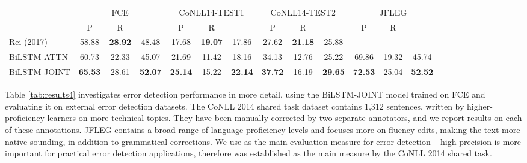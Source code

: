 \documentclass[letterpaper]{article} \usepackage{aaai19}  \usepackage{times}  \usepackage{helvet}  \usepackage{courier}  \usepackage{graphicx}
\renewcommand\cite{\citep}	\newcommand\newcite{\citet}
\begin{document}
\begin{table*}[t]
\centering
\setlength\tabcolsep{6.7pt}
\begin{tabular}{l|ccc|ccc|ccc|ccc} \toprule
 & \multicolumn{3}{c|}{{\small FCE}} & \multicolumn{3}{c|}{{\small CoNLL14-TEST1}} & \multicolumn{3}{c|}{{\small CoNLL14-TEST2}} & \multicolumn{3}{c}{{\small JFLEG}} \\
& {\small P} & {\small R} & {\small } & {\small P} & {\small R} & {\small } & {\small P} & {\small R} & {\small } & {\small P} & {\small R} & {\small } \\ \midrule
Rei (2017) & 58.88 & \textbf{28.92} & 48.48 & 17.68 & \textbf{19.07} & 17.86 & 27.62 & \textbf{21.18} & 25.88 & - & - & -\\
{\small BiLSTM-ATTN} & 60.73 & 22.33 & 45.07 & 21.69 & 11.42 & 18.16 & 34.13 & 12.76 & 25.22 & 69.86 & 19.32 & 45.74\\
{\small BiLSTM-JOINT} & \textbf{65.53} & 28.61 & \textbf{52.07} & \textbf{25.14} & 15.22 & \textbf{22.14} & \textbf{37.72} & 16.19 & \textbf{29.65} & \textbf{72.53} & 25.04 & \textbf{52.52}\\ \bottomrule
\end{tabular}
\caption{Sequence labeling results on error detection datasets.
Comparing the best system from \citet{Rei2017}, {\small BiLSTM-ATTN} supervised only for sequence labeling, and {\small BiLSTM-JOINT} optimized with all the auxiliary objectives.
}
\label{tab:results4}
\end{table*}








Table \ref{tab:results4} investigates error detection performance in more detail, using the {\small BiLSTM-JOINT} model trained on FCE and evaluating it on external error detection datasets.
The CoNLL 2014 shared task dataset \cite{Ng2013a} contains 1,312 sentences, written by higher-proficiency learners on more technical topics. They have been manually corrected by two separate annotators, and we report results on each of these annotations.
JFLEG \cite{Napoles2017} contains a broad range of language
proficiency levels and focuses more on fluency edits, making the text more native-sounding, in addition to grammatical corrections.
We use  as the main evaluation measure for error detection -- high precision is more important for practical error detection applications, therefore  was established as the main measure by the CoNLL 2014 shared task.
\end{document}
